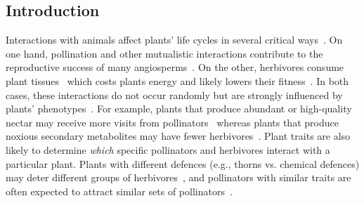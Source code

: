 \documentclass[12pt]{article}
\begin{document}
\begin{spacing}{1.5}

\section*{Introduction}

  Interactions with animals affect plants' life cycles in several critical
  ways~\citep{Mayr2001}. On one hand,
  pollination and other mutualistic interactions contribute
  to the reproductive success of many angiosperms~\citep{Ollerton2011}. 
  On the other, herbivores consume plant tissues~\citep{McCall2006} which
  costs plants energy and likely lowers their fitness~\citep{Strauss2002}.
  In both cases, these interactions do not occur randomly but
  are strongly influenced by plants' phenotypes~\citep{Fontaine2015}. 
  For example, plants that 
  produce abundant or high-quality nectar may receive more visits from
  pollinators~\citep{Robertson1999} whereas plants that produce noxious 
  secondary metabolites may have fewer herbivores~\citep{Johnson2014}. 
  Plant traits are also likely to determine \emph{which} specific pollinators 
  and herbivores interact with a particular plant. Plants with different defences 
  (e.g., thorns vs. chemical defences) may deter different groups of 
  herbivores~\citep{Ehrlich1964,Johnson2014}, and pollinators with similar traits are often expected to attract similar sets of pollinators~\citep{Waser1996,Fenster2004,Ollerton2009}.



\end{spacing}
\end{document}
